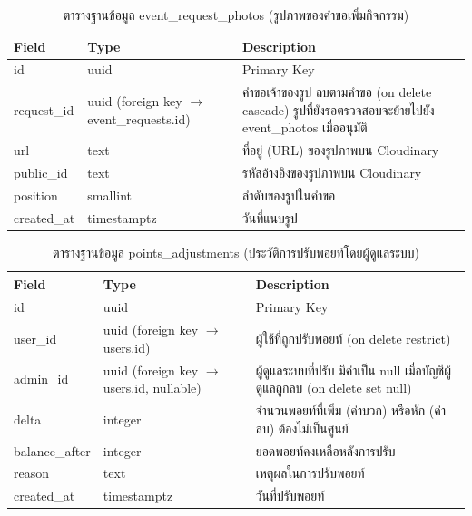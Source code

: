 \begin{table}[H]
\centering
\caption{ตารางฐานข้อมูล event\_request\_photos (รูปภาพของคำขอเพิ่มกิจกรรม)}
\label{tab:db_erphotos}
\begin{tabular}{|p{3.6cm}|p{2.6cm}|p{6.8cm}|}
\hline
\textbf{Field} & \textbf{Type} & \textbf{Description} \\
\hline
id & uuid & Primary Key \\ \hline
request\_id & uuid (foreign key $\to$ event\_requests.id) & คำขอเจ้าของรูป ลบตามคำขอ (on delete cascade) รูปที่ยังรอตรวจสอบจะย้ายไปยัง event\_photos เมื่ออนุมัติ \\ \hline
url & text & ที่อยู่ (URL) ของรูปภาพบน Cloudinary \\ \hline
public\_id & text & รหัสอ้างอิงของรูปภาพบน Cloudinary \\ \hline
position & smallint & ลำดับของรูปในคำขอ \\ \hline
created\_at & timestamptz & วันที่แนบรูป \\
\hline
\end{tabular}
\end{table}

\begin{table}[H]
\centering
\caption{ตารางฐานข้อมูล points\_adjustments (ประวัติการปรับพอยท์โดยผู้ดูแลระบบ)}
\label{tab:db_adjust}
\begin{tabular}{|p{3.6cm}|p{2.6cm}|p{6.8cm}|}
\hline
\textbf{Field} & \textbf{Type} & \textbf{Description} \\
\hline
id & uuid & Primary Key \\ \hline
user\_id & uuid (foreign key $\to$ users.id) & ผู้ใช้ที่ถูกปรับพอยท์ (on delete restrict) \\ \hline
admin\_id & uuid (foreign key $\to$ users.id, nullable) & ผู้ดูแลระบบที่ปรับ มีค่าเป็น null เมื่อบัญชีผู้ดูแลถูกลบ (on delete set null) \\ \hline
delta & integer & จำนวนพอยท์ที่เพิ่ม (ค่าบวก) หรือหัก (ค่าลบ) ต้องไม่เป็นศูนย์ \\ \hline
balance\_after & integer & ยอดพอยท์คงเหลือหลังการปรับ \\ \hline
reason & text & เหตุผลในการปรับพอยท์ \\ \hline
created\_at & timestamptz & วันที่ปรับพอยท์ \\
\hline
\end{tabular}
\end{table}

